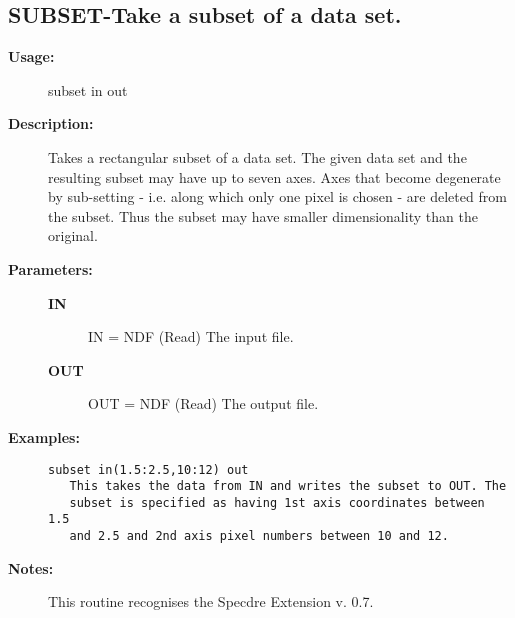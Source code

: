 \subsection{SUBSET-\label{SUBSET}Take a subset of a data set.}
\begin{description}

\item [{\bf Usage:}]

   subset in out


\item [{\bf Description:}]

   Takes a rectangular subset of a data set. The given data set and
   the resulting subset may have up to seven axes. Axes that become
   degenerate by sub-setting - i.e. along which only one pixel is
   chosen - are deleted from the subset. Thus the subset may have
   smaller dimensionality than the original.

\item [{\bf Parameters:}]
\begin{description}
\item [{\bf IN}]
IN = NDF (Read)
   The input file.
\item [{\bf OUT}]
OUT = NDF (Read)
   The output file.
\end{description}

\item [{\bf Examples:}]
\begin{verbatim}
subset in(1.5:2.5,10:12) out
   This takes the data from IN and writes the subset to OUT. The
   subset is specified as having 1st axis coordinates between 1.5
   and 2.5 and 2nd axis pixel numbers between 10 and 12.
\end{verbatim}

\item [{\bf Notes:}]
This routine recognises the Specdre Extension v. 0.7.
\end{description}
